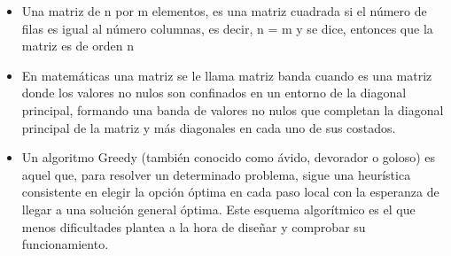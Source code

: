 \begin{itemize}

\item Una matriz de n por m elementos, es una matriz cuadrada si el número de filas es igual al número columnas, es decir, n = m y se dice, entonces que la matriz es de orden n

\item En matemáticas una matriz se le llama matriz banda cuando es una matriz donde los valores no nulos son confinados en un entorno de la diagonal principal, formando una banda de valores no nulos que completan la diagonal principal de la matriz y más diagonales en cada uno de sus costados.

\item Un algoritmo Greedy (también conocido como ávido, devorador o goloso) es aquel que, para resolver un determinado problema, sigue una heurística consistente en elegir la opción óptima en cada paso local con la esperanza de llegar a una solución general óptima. Este esquema algorítmico es el que menos dificultades plantea a la hora de diseñar y comprobar su funcionamiento.

\end{itemize}






